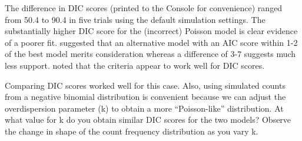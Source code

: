 \documentclass[
]{krantz}
\makeatletter
\newenvironment{Shaded}{\begin{snugshade}}{\end{snugshade}}
\newcommand{\AttributeTok}[1]{\textcolor[rgb]{0.27,0.27,0.27}{#1}}
\newcommand{\CommentTok}[1]{\textcolor[rgb]{0.37,0.37,0.37}{\textit{#1}}}
\newcommand{\ControlFlowTok}[1]{\textcolor[rgb]{0.27,0.27,0.27}{\textbf{#1}}}
\newcommand{\DecValTok}[1]{\textcolor[rgb]{0.06,0.06,0.06}{#1}}
\newcommand{\FloatTok}[1]{\textcolor[rgb]{0.06,0.06,0.06}{#1}}
\newcommand{\FunctionTok}[1]{\textcolor[rgb]{0.27,0.27,0.27}{\textbf{#1}}}
\newcommand{\NormalTok}[1]{#1}
\newcommand{\OtherTok}[1]{\textcolor[rgb]{0.37,0.37,0.37}{#1}}
\newcommand{\SpecialCharTok}[1]{\textcolor[rgb]{0.43,0.43,0.43}{\textbf{#1}}}
\newcommand{\StringTok}[1]{\textcolor[rgb]{0.5,0.5,0.5}{#1}}
\newenvironment{kframe}{%
\medskip{}
\setlength{\fboxsep}{.8em}
 \def\at@end@of@kframe{}%
 \ifinner\ifhmode%
  \def\at@end@of@kframe{\end{minipage}}%
  \begin{minipage}{\columnwidth}%
 \fi\fi%
 \def\FrameCommand##1{\hskip\@totalleftmargin \hskip-\fboxsep
 \colorbox{shadecolor}{##1}\hskip-\fboxsep
     \hskip-\linewidth \hskip-\@totalleftmargin \hskip\columnwidth}%
 \MakeFramed {\advance\hsize-\width
   \@totalleftmargin\z@ \linewidth\hsize
   \@setminipage}}%
 {\par\unskip\endMakeFramed%
 \at@end@of@kframe}
\renewenvironment{Shaded}{\begin{kframe}}{\end{kframe}}
\makeatother
\begin{document}
\begin{Shaded}
\end{Shaded}

The difference in DIC scores (printed to the Console for convenience) ranged from 50.4 to 90.4 in five trials using the default simulation settings. The substantially higher DIC score for the (incorrect) Poisson model is clear evidence of a poorer fit. \citet{burnham.anderson_2004} suggested that an alternative model with an AIC score within 1-2 of the best model merits consideration whereas a difference of 3-7 suggests much less support. \citet{spiegelhalter.etal_2002} noted that the \citet{burnham.anderson_2004} criteria appear to work well for DIC scores.

Comparing DIC scores worked well for this case. Also, using simulated counts from a negative binomial distribution is convenient because we can adjust the overdispersion parameter (k) to obtain a more ``Poisson-like'' distribution. At what value for k do you obtain similar DIC scores for the two models? Observe the change in shape of the count frequency distribution as you vary k.
\end{document}
